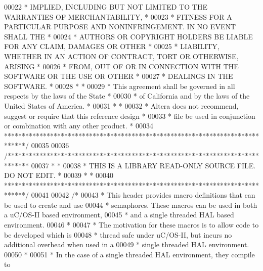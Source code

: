 \begin{DoxyCode}
00022 \textcolor{comment}{* IMPLIED, INCLUDING BUT NOT LIMITED TO THE WARRANTIES OF MERCHANTABILITY,    *}
00023 \textcolor{comment}{* FITNESS FOR A PARTICULAR PURPOSE AND NONINFRINGEMENT. IN NO EVENT SHALL THE *}
00024 \textcolor{comment}{* AUTHORS OR COPYRIGHT HOLDERS BE LIABLE FOR ANY CLAIM, DAMAGES OR OTHER      *}
00025 \textcolor{comment}{* LIABILITY, WHETHER IN AN ACTION OF CONTRACT, TORT OR OTHERWISE, ARISING     *}
00026 \textcolor{comment}{* FROM, OUT OF OR IN CONNECTION WITH THE SOFTWARE OR THE USE OR OTHER         *}
00027 \textcolor{comment}{* DEALINGS IN THE SOFTWARE.                                                   *}
00028 \textcolor{comment}{*                                                                             *}
00029 \textcolor{comment}{* This agreement shall be governed in all respects by the laws of the State   *}
00030 \textcolor{comment}{* of California and by the laws of the United States of America.              *}
00031 \textcolor{comment}{*                                                                             *}
00032 \textcolor{comment}{* Altera does not recommend, suggest or require that this reference design    *}
00033 \textcolor{comment}{* file be used in conjunction or combination with any other product.          *}
00034 \textcolor{comment}{******************************************************************************/}
00035 
00036 \textcolor{comment}{/******************************************************************************}
00037 \textcolor{comment}{*                                                                             *}
00038 \textcolor{comment}{* THIS IS A LIBRARY READ-ONLY SOURCE FILE. DO NOT EDIT.                       *}
00039 \textcolor{comment}{*                                                                             *}
00040 \textcolor{comment}{******************************************************************************/}
00041 
00042 \textcolor{comment}{/*}
00043 \textcolor{comment}{ * This header provides macro definitions that can be used to create and use}
00044 \textcolor{comment}{ * semaphores. These macros can be used in both a uC/OS-II based environment,}
00045 \textcolor{comment}{ * and a single threaded HAL based environment.}
00046 \textcolor{comment}{ *}
00047 \textcolor{comment}{ * The motivation for these macros is to allow code to be developed which is}
00048 \textcolor{comment}{ * thread safe under uC/OS-II, but incurs no additional overhead when used in a}
00049 \textcolor{comment}{ * single threaded HAL environment.  }
00050 \textcolor{comment}{ *}
00051 \textcolor{comment}{ * In the case of a single threaded HAL environment, they compile to }

\end{DoxyCode}
